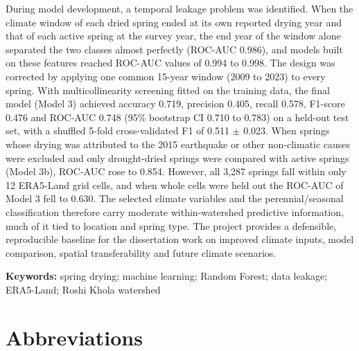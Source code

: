 \documentclass[12pt,a4paper]{article}
\begin{document}
During model development, a temporal leakage problem was identified. When the climate window of each dried spring ended at its own reported drying year and that of each active spring at the survey year, the end year of the window alone separated the two classes almost perfectly (ROC-AUC 0.986), and models built on these features reached ROC-AUC values of 0.994 to 0.998. The design was corrected by applying one common 15-year window (2009 to 2023) to every spring. With multicollinearity screening fitted on the training data, the final model (Model 3) achieved accuracy 0.719, precision 0.405, recall 0.578, F1-score 0.476 and ROC-AUC 0.748 (95\% bootstrap CI 0.710 to 0.783) on a held-out test set, with a shuffled 5-fold cross-validated F1 of 0.511 $\pm$ 0.023. When springs whose drying was attributed to the 2015 earthquake or other non-climatic causes were excluded and only drought-dried springs were compared with active springs (Model 3b), ROC-AUC rose to 0.854. However, all 3,287 springs fall within only 12 ERA5-Land grid cells, and when whole cells were held out the ROC-AUC of Model 3 fell to 0.630. The selected climate variables and the perennial/seasonal classification therefore carry moderate within-watershed predictive information, much of it tied to location and spring type. The project provides a defensible, reproducible baseline for the dissertation work on improved climate inputs, model comparison, spatial transferability and future climate scenarios.

\textbf{Keywords:} spring drying; machine learning; Random Forest; data leakage; ERA5-Land; Roshi Khola watershed

\clearpage
\tableofcontents
\clearpage
{}
{}
\listoffigures
\clearpage
{}
{}
\listoftables
\clearpage

\clearpage
\section*{Abbreviations}
\end{document}
